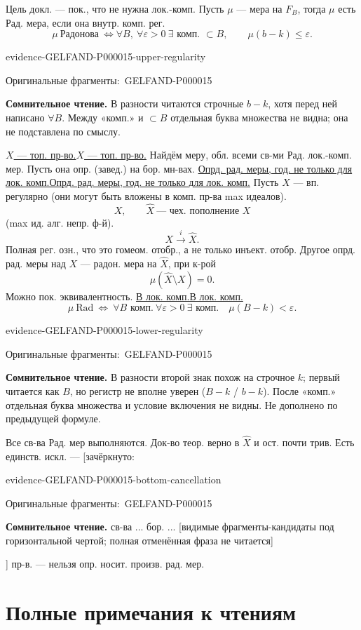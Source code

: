 \documentclass[11pt]{article}
\let\MathUnderline\underline
\renewcommand{\underline}[1]{\ifmmode\MathUnderline{#1}\else\uline{#1}\fi}
\newcommand{\EvidenceBlock}[4]{%
 \par\smallskip\noindent\begin{minipage}{\linewidth}
 \begin{minipage}[t]{.47\linewidth}\vspace{0pt}\centering
 \csname evidence-#1-#2\endcsname\par
 {\scriptsize\SourceCropCaption\ #1}\par
 \end{minipage}\hfill
 \begin{minipage}[t]{.49\linewidth}\vspace{0pt}\raggedright
 {\small\color{orange!65!black}\textbf{#4} #3}\par
 \end{minipage}
 \end{minipage}\par\smallskip}
\newcommand{\Unclear}[3]{\EvidenceBlock{#1}{#2}{#3}{\ReadingCaption}}
\newcommand{\SourceCropCaption}{Оригинальные фрагменты:}\newcommand{\ReadingCaption}{Сомнительное чтение.}\newcommand{\IncompleteCaption}{Неразобранный фрагмент.}\newcommand{\DiagramCaption}{Рисунок и набранное описание.}
\begin{document}
Цель докл. --- пок., что не нужна лок.-комп.
Пусть $\mu$ --- мера на $F_B$, тогда $\mu$ есть Рад. мера, если она внутр. комп. рег.
\begin{equation*}
\mu\ \text{Радонова}\ \Longleftrightarrow
\forall B,\ \forall\varepsilon>0\ \exists\text{ комп. }\subset B,\qquad
\mu(b-k)\leq\varepsilon.
\end{equation*}
\Unclear{GELFAND-P000015}{upper-regularity}{В разности читаются строчные $b-k$, хотя перед ней написано $\forall B$. Между «комп.» и $\subset B$ отдельная буква множества не видна; она не подставлена по смыслу.}
[Горизонтальный разделитель.]

\underline{$X$ --- топ. пр-во.}
Найдём меру, обл. всеми св-ми Рад. лок.-комп. мер.
Пусть она опр. (завед.) на бор. мн-вах.
\underline{Опрд. рад. меры, год. не только для лок. комп.}
Пусть $X$ --- вп. регулярно (они могут быть вложены в комп. пр-ва max идеалов).
\begin{equation*}
X,\qquad \widehat X\ \text{--- чех. пополнение }X
\end{equation*}
(max ид. алг. непр. ф-й).
\begin{equation*}
X\overset i\longrightarrow\widehat X.
\end{equation*}
Полная рег. озн., что это гомеом. отобр., а не только инъект. отобр.
Другое опрд. рад. меры над $X$ --- радон. мера на $\widehat X$, при к-рой
\begin{equation*}
\mu(\widehat X\setminus X)=0.
\end{equation*}
Можно пок. эквивалентность.
\underline{В лок. комп.}
\begin{equation*}
\mu\ \mathrm{Rad}\ \Longleftrightarrow\ \forall B\text{ комп.}\ \forall\varepsilon>0\ \exists\text{ комп.}\quad
\mu(B-k)<\varepsilon.
\end{equation*}
\Unclear{GELFAND-P000015}{lower-regularity}{В разности второй знак похож на строчное $k$; первый читается как $B$, но регистр не вполне уверен ($B-k$ / $b-k$). После «комп.» отдельная буква множества и условие включения не видны. Не дополнено по предыдущей формуле.}
Все св-ва Рад. мер выполняются.
Док-во теор. верно в $\widehat X$ и ост. почти трив.
Есть единств. искл. --- [зачёркнуто: \Unclear{GELFAND-P000015}{bottom-cancellation}{св-ва ... бор. ... [видимые фрагменты-кандидаты под горизонтальной чертой; полная отменённая фраза не читается]}] пр-в.
--- нельзя опр. носит. произв. рад. мер.


\clearpage\section*{Полные примечания к чтениям}
\end{document}
